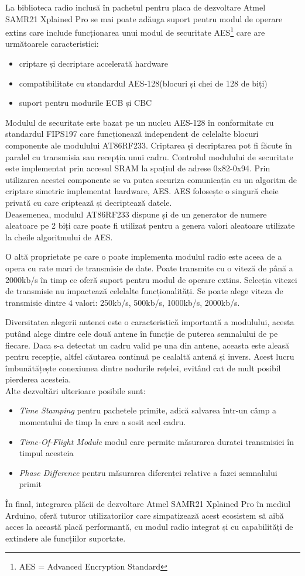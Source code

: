 \documentclass[12pt,a4paper]{report}
\begin{document}
La biblioteca radio inclusă în pachetul pentru placa de dezvoltare Atmel SAMR21 Xplained Pro se mai poate adăuga suport pentru modul de operare extins care include funcționarea unui modul de securitate AES\footnote{AES = Advanced Encryption Standard} care are următoarele caracteristici:
\begin{itemize}
	\item criptare și decriptare accelerată hardware
	\item compatibilitate cu standardul AES-128(blocuri și chei de 128 de biți)
	\item suport pentru modurile ECB și CBC
\end{itemize}
Modulul de securitate este bazat pe un nucleu AES-128 în conformitate cu standardul FIPS197\cite{fips197} care funcționează independent de celelalte blocuri componente ale modulului AT86RF233. Criptarea și decriptarea pot fi făcute în paralel cu transmisia sau recepția unui cadru. Controlul modulului de securitate este implementat prin accesul SRAM la spațiul de adrese 0x82-0x94.
Prin utilizarea acestei componente se va putea securiza comunicația cu un algoritm de criptare simetric implementat hardware, AES. AES folosește o singură cheie privată cu care criptează și decriptează datele.\\
Deasemenea, modulul AT86RF233 dispune și de un generator de numere aleatoare pe 2 biți care poate fi utilizat pentru a genera valori aleatoare utilizate la cheile algoritmului de AES.

O altă proprietate pe care o poate implementa modulul radio este aceea de a opera cu rate mari de transmisie de date. Poate transmite cu o viteză de până a 2000kb/s în timp ce oferă suport pentru modul de operare extins. Selecția vitezei de transmisie nu impactează celelalte funcționalități. Se poate alege viteza de transmisie dintre 4 valori: 250kb/s, 500kb/s, 1000kb/s, 2000kb/s.

Diversitatea alegerii antenei este o caracteristică importantă a modulului, acesta putând alege dintre cele două antene în funcție de puterea semnalului de pe fiecare. Daca s-a detectat un cadru valid pe una din antene, aceasta este aleasă pentru recepție, altfel căutarea continuă pe cealaltă antenă și invers. Acest lucru îmbunătățește conexiunea dintre nodurile rețelei, evitând cat de mult posibil pierderea acesteia.\\
Alte dezvoltări ulterioare posibile sunt:
\begin{itemize}
 	\item  \textit{Time Stamping} pentru pachetele primite, adică salvarea într-un câmp a momentului de timp la care a sosit acel cadru.
	\item \textit{Time-Of-Flight Module} modul care permite măsurarea duratei transmisiei în timpul acesteia
	\item \textit{Phase Difference} pentru măsurarea diferenței relative a fazei semnalului primit
\end{itemize}
În final, integrarea plăcii de dezvoltare Atmel SAMR21 Xplained Pro în mediul Arduino, oferă tuturor utilizatorilor care simpatizează acest ecosistem să aibă acces la această placă performantă, cu modul radio integrat și cu capabilități de extindere ale funcțiilor suportate.
\end{document}
